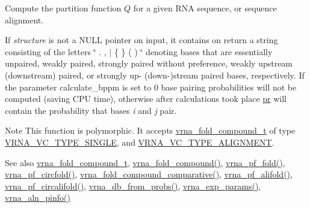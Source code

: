 Compute the partition function $Q$ for a given R\+N\+A sequence, or sequence alignment. 

If {\itshape structure} is not a N\+U\+L\+L pointer on input, it contains on return a string consisting of the letters \char`\"{} . , $\vert$ \{ \} ( ) \char`\"{} denoting bases that are essentially unpaired, weakly paired, strongly paired without preference, weakly upstream (downstream) paired, or strongly up-\/ (down-\/)stream paired bases, respectively. If the parameter calculate\+\_\+bppm is set to 0 base pairing probabilities will not be computed (saving C\+P\+U time), otherwise after calculations took place \hyperlink{fold__vars_8h_ac98ec419070aee6831b44e5c700f090f}{pr} will contain the probability that bases {\itshape i} and {\itshape j} pair.

\begin{DoxyNote}{Note}
This function is polymorphic. It accepts \hyperlink{group__fold__compound_ga1b0cef17fd40466cef5968eaeeff6166}{vrna\+\_\+fold\+\_\+compound\+\_\+t} of type \hyperlink{group__fold__compound_gga01a4ff86fa71deaaa5d1abbd95a1447da1608d3aa78905fc39e0d25a624ac9512}{V\+R\+N\+A\+\_\+\+V\+C\+\_\+\+T\+Y\+P\+E\+\_\+\+S\+I\+N\+G\+L\+E}, and \hyperlink{group__fold__compound_gga01a4ff86fa71deaaa5d1abbd95a1447da056345f1bcfe7cd595d1fd437c05246d}{V\+R\+N\+A\+\_\+\+V\+C\+\_\+\+T\+Y\+P\+E\+\_\+\+A\+L\+I\+G\+N\+M\+E\+N\+T}.
\end{DoxyNote}
\begin{DoxySeeAlso}{See also}
\hyperlink{group__fold__compound_ga1b0cef17fd40466cef5968eaeeff6166}{vrna\+\_\+fold\+\_\+compound\+\_\+t}, \hyperlink{group__fold__compound_ga6601d994ba32b11511b36f68b08403be}{vrna\+\_\+fold\+\_\+compound()}, \hyperlink{group__pf__fold_ga59935ba485ac90f0efb5a38e2962d879}{vrna\+\_\+pf\+\_\+fold()}, \hyperlink{group__pf__fold_ga6dc133fce577fc0370986f3a3301cd10}{vrna\+\_\+pf\+\_\+circfold()}, \hyperlink{group__fold__compound_gad6bacc816af274922b13d947f708aa0c}{vrna\+\_\+fold\+\_\+compound\+\_\+comparative()}, \hyperlink{group__consensus__pf__fold_gaef750636c70e597a85ee139197a4350d}{vrna\+\_\+pf\+\_\+alifold()}, \hyperlink{group__consensus__pf__fold_ga017209394a4c1e68d96cd47e61d16d25}{vrna\+\_\+pf\+\_\+circalifold()}, \hyperlink{group__struct__utils_ga0c28c410a5ab22d6ab9c77a84e8d5b44}{vrna\+\_\+db\+\_\+from\+\_\+probs()}, \hyperlink{group__energy__parameters_gab1f3016f96aa96bff020cdd904605afa}{vrna\+\_\+exp\+\_\+params()}, \hyperlink{group__aln__utils_gaf6421a1318586c59fea6a127ed9f65f3}{vrna\+\_\+aln\+\_\+pinfo()}
\end{DoxySeeAlso}

